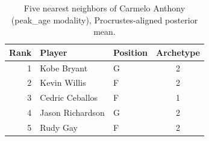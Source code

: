 \begin{table}[htbp]
  \centering\small
  \begin{tabular}{rllc}
    \toprule
    Rank & Player & Position & Archetype \\
    \midrule
    1 & Kobe Bryant & G & 2 \\
    2 & Kevin Willis & F & 2 \\
    3 & Cedric Ceballos & F & 1 \\
    4 & Jason Richardson & G & 2 \\
    5 & Rudy Gay & F & 2 \\
    \bottomrule
  \end{tabular}
  \caption{Five nearest neighbors of Carmelo Anthony (peak_age modality), Procrustes-aligned posterior mean.}
  \label{tab:Carmelo_Anthony_neighbors_peak_age}
\end{table}

